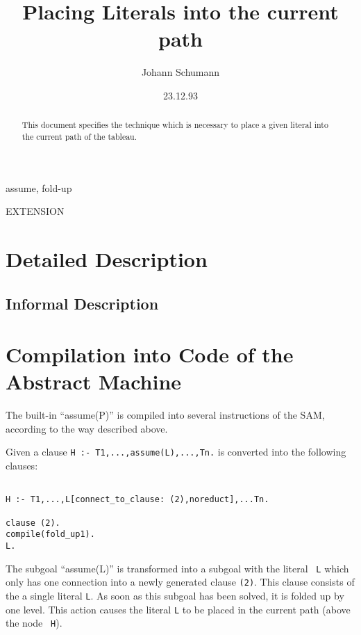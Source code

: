 

\title{Placing Literals into the current path}
\author{Johann Schumann}
\date{23.12.93}



\maketitle

\begin{abstract}
This document specifies the technique which is necessary to place
a given literal into the current path of the tableau.
\end{abstract}

  assume, fold-up

 EXTENSION

\section{Detailed Description}

\subsection{Informal Description}

\section{Compilation into Code of the Abstract Machine}

The built-in ``assume(P)'' is compiled into several instructions
of the SAM, according to the way described above.

Given a clause {\tt H :- T1,...,assume(L),...,Tn.} is converted
into the following clauses:

\begin{verbatim}

H :- T1,...,L[connect_to_clause: (2),noreduct],...Tn.

clause (2).
compile(fold_up1).
L.
\end{verbatim}

The subgoal ``assume(L)'' is transformed into a subgoal with
the literal {\tt ~L} which only has one connection into a newly
generated clause {\tt (2)}. This clause consists of the a
single literal {\tt L}. As soon as this subgoal has been solved,
it is folded up by one level.
This action causes the literal {\tt L} to be placed in the
current path (above the node {\tt ~H}).

